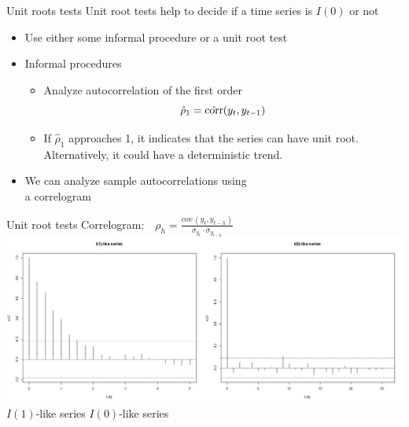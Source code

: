 \documentclass{beamer}
\begin{document}
\begin{frame}{Unit roots tests}
Unit root tests help to decide if a time series is $I(0)$ or not
\vspace{0.4cm}
\begin{itemize}
\item Use either some informal procedure or a unit root test
\vspace{0.4cm}
\item Informal procedures
\begin{itemize}
\item Analyze autocorrelation of the first order
$$\hat{\rho}_1=\hat{\textnormal{corr}}(y_t,y_{t-1})$$
\item If $\hat{\rho}_1$ approaches 1, it indicates that the series can have unit root. Alternatively, it could have a deterministic trend.
\end{itemize}
\item We can analyze sample autocorrelations using \\a correlogram
\end{itemize}
\end{frame}
\begin{frame}{Unit root tests}
Correlogram:  
$\, \, \, \, \rho_h = \frac{\textit{cov} \, (y_t, y_{t-h})}{\sigma_{y_t} \cdot \sigma_{y_{t-h}}}$
\includegraphics[width=1\textwidth]{img/corelogramWeek2.jpg}
\hspace{1.5cm} $I(1)$-like series \hspace{3 cm} $I(0)$-like series
\end{frame}
\end{document}
